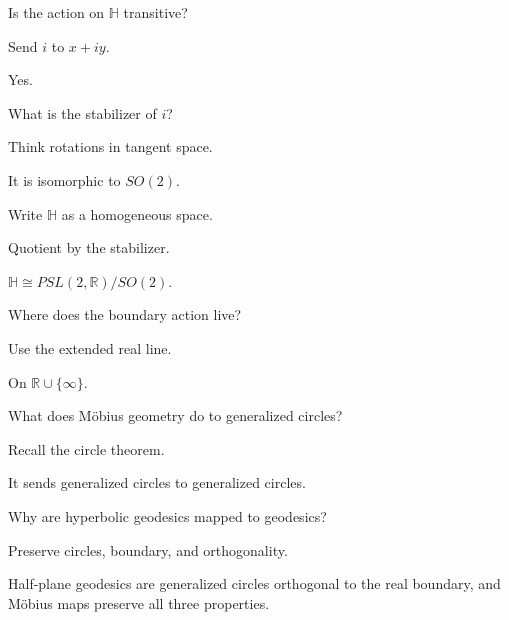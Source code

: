 \begin{exercise}\label{exr:vii33-12}
Is the action on \(\mathbb H\) transitive?
\end{exercise}
\begin{hint}
Send \(i\) to \(x+iy\).
\end{hint}
\begin{solution}
Yes.
\end{solution}

\begin{exercise}\label{exr:vii33-13}
What is the stabilizer of \(i\)?
\end{exercise}
\begin{hint}
Think rotations in tangent space.
\end{hint}
\begin{solution}
It is isomorphic to \(SO(2)\).
\end{solution}

\begin{exercise}\label{exr:vii33-14}
Write \(\mathbb H\) as a homogeneous space.
\end{exercise}
\begin{hint}
Quotient by the stabilizer.
\end{hint}
\begin{solution}
\(\mathbb H\cong PSL(2,\mathbb R)/SO(2)\).
\end{solution}

\begin{exercise}\label{exr:vii33-15}
Where does the boundary action live?
\end{exercise}
\begin{hint}
Use the extended real line.
\end{hint}
\begin{solution}
On \(\mathbb R\cup\{\infty\}\).
\end{solution}

\begin{exercise}\label{exr:vii33-16}
What does Möbius geometry do to generalized circles?
\end{exercise}
\begin{hint}
Recall the circle theorem.
\end{hint}
\begin{solution}
It sends generalized circles to generalized circles.
\end{solution}

\begin{exercise}\label{exr:vii33-17}
Why are hyperbolic geodesics mapped to geodesics?
\end{exercise}
\begin{hint}
Preserve circles, boundary, and orthogonality.
\end{hint}
\begin{solution}
Half-plane geodesics are generalized circles orthogonal to the real boundary, and Möbius maps preserve all three properties.
\end{solution}

